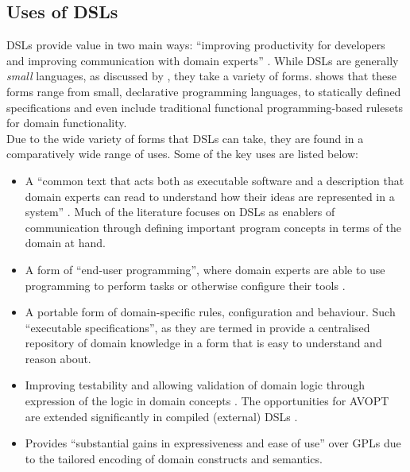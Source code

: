 \documentclass[a4paper,11pt]{report}
\begin{document}


\subsection{Uses of DSLs} %
\label{sub:uses_of_dsls}
DSLs provide value in two main ways: ``improving productivity for developers and improving communication with domain experts'' \citep{fowler2010domain}. 
While DSLs are generally \textit{small} languages, as discussed by \citet{van2000domain}, they take a variety of forms.
\citet{fowler2010domain} shows that these forms range from small, declarative programming languages, to statically defined specifications and even include traditional functional programming-based rulesets for domain functionality.\\

Due to the wide variety of forms that DSLs can take, they are found in a comparatively wide range of uses.
Some of the key uses are listed below:
\begin{itemize}
    \item A ``common text that acts both as executable software and a description that domain experts can read to understand how their ideas are represented in a system'' \citep{fowler2010domain}.
    Much of the literature focuses on DSLs as enablers of communication through defining important program concepts in terms of the domain at hand.
    \item A form of ``end-user programming'', where domain experts are able to use programming to perform tasks or otherwise configure their tools \citep{van2000domain}.
    \item A portable form of domain-specific rules, configuration and behaviour. 
    Such ``executable specifications'', as they are termed in \citet{fabry2015taxonomy} provide a centralised repository of domain knowledge in a form that is easy to understand and reason about. 
    \item Improving testability and allowing validation of domain logic through expression of the logic in domain concepts \citep{van2000domain}.
    The opportunities for AVOPT are extended significantly in compiled (external) DSLs \citep{Mernik:2005:DDL:1118890.1118892}.
    \item Provides ``substantial gains in expressiveness and ease of use'' \citep[pg. 2]{Mernik:2005:DDL:1118890.1118892} over GPLs due to the tailored encoding of domain constructs and semantics. 
\end{itemize}
\end{document}
